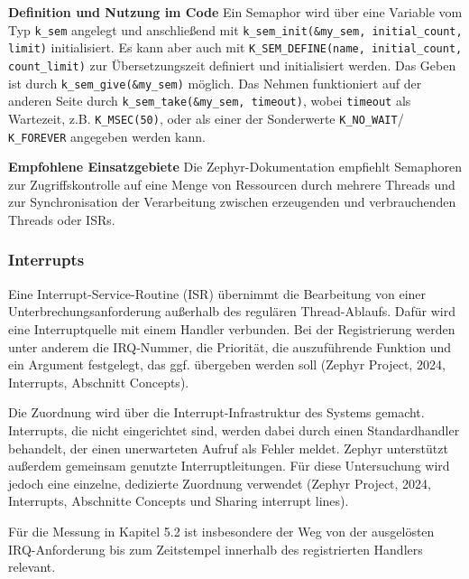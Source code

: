 \textbf{Definition und Nutzung im Code }Ein Semaphor wird {\"u}ber eine Variable vom Typ \lstinline[style=codeinline]|k_sem| angelegt und anschlie{\ss}end mit \lstinline[style=codeinline]|k_sem_init(&my_sem, initial_count, limit)| initialisiert. Es kann aber auch mit \lstinline[style=codeinline]|K_SEM_DEFINE(name, initial_count, count_limit)| zur {\"U}bersetzungszeit definiert und initialisiert werden. Das Geben ist durch \lstinline[style=codeinline]|k_sem_give(&my_sem)| m{\"o}glich. Das Nehmen funktioniert auf der anderen Seite durch \lstinline[style=codeinline]|k_sem_take(&my_sem, timeout)|, wobei \lstinline[style=codeinline]|timeout| als Wartezeit, z.B. \lstinline[style=codeinline]|K_MSEC(50)|, oder als einer der Sonderwerte \lstinline[style=codeinline]|K_NO_WAIT|/ \lstinline[style=codeinline]|K_FOREVER| angegeben werden kann.

\textbf{Empfohlene Einsatzgebiete }Die Zephyr-Dokumentation empfiehlt Semaphoren zur Zugriffskontrolle auf eine Menge von Ressourcen durch mehrere Threads und zur Synchronisation der Verarbeitung zwischen erzeugenden und verbrauchenden Threads oder ISRs.

\subsubsection{Interrupts}
Eine Interrupt-Service-Routine (ISR) {\"u}bernimmt die Bearbeitung von einer Unterbrechungsanforderung au{\ss}erhalb des regul{\"a}ren Thread-Ablaufs. Daf{\"u}r wird eine Interruptquelle mit einem Handler verbunden. Bei der Registrierung werden unter anderem die IRQ-Nummer, die Priorit{\"a}t, die auszuf{\"u}hrende Funktion und ein Argument festgelegt, das ggf. {\"u}bergeben werden soll (Zephyr Project, 2024, \glqq{}Interrupts\grqq{}, Abschnitt \glqq{}Concepts\grqq{}).

Die Zuordnung wird {\"u}ber die Interrupt-Infrastruktur des Systems gemacht. Interrupts, die nicht eingerichtet sind, werden dabei durch einen Standardhandler behandelt, der einen unerwarteten Aufruf als Fehler meldet. Zephyr unterst{\"u}tzt au{\ss}erdem gemeinsam genutzte Interruptleitungen. F{\"u}r diese Untersuchung wird jedoch eine einzelne, dedizierte Zuordnung verwendet (Zephyr Project, 2024, \glqq{}Interrupts\grqq{}, Abschnitte \glqq{}Concepts\grqq{} und \glqq{}Sharing interrupt lines\grqq{}).

F{\"u}r die Messung in Kapitel 5.2 ist insbesondere der Weg von der ausgel{\"o}sten IRQ-Anforderung bis zum Zeitstempel innerhalb des registrierten Handlers relevant.

